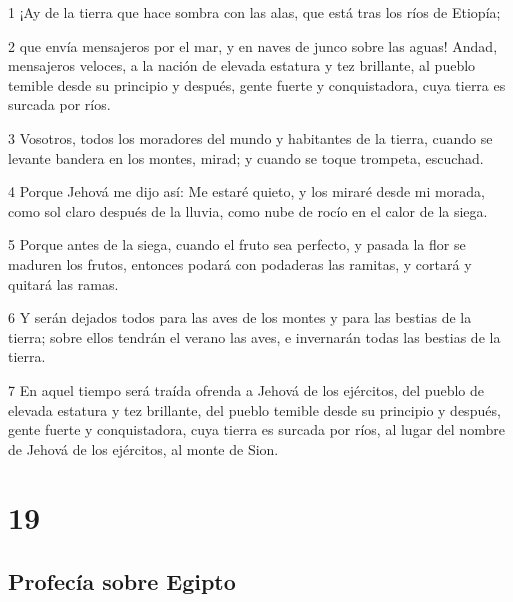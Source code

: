 \par 1 ¡Ay de la tierra que hace sombra con las alas, que está tras los ríos de Etiopía; 
\par 2 que envía mensajeros por el mar, y en naves de junco sobre las aguas! Andad, mensajeros veloces, a la nación de elevada estatura y tez brillante, al pueblo temible desde su principio y después, gente fuerte y conquistadora, cuya tierra es surcada por ríos.
\par 3 Vosotros, todos los moradores del mundo y habitantes de la tierra, cuando se levante bandera en los montes, mirad; y cuando se toque trompeta, escuchad.
\par 4 Porque Jehová me dijo así: Me estaré quieto, y los miraré desde mi morada, como sol claro después de la lluvia, como nube de rocío en el calor de la siega.
\par 5 Porque antes de la siega, cuando el fruto sea perfecto, y pasada la flor se maduren los frutos, entonces podará con podaderas las ramitas, y cortará y quitará las ramas.
\par 6 Y serán dejados todos para las aves de los montes y para las bestias de la tierra; sobre ellos tendrán el verano las aves, e invernarán todas las bestias de la tierra.
\par 7 En aquel tiempo será traída ofrenda a Jehová de los ejércitos, del pueblo de elevada estatura y tez brillante, del pueblo temible desde su principio y después, gente fuerte y conquistadora, cuya tierra es surcada por ríos, al lugar del nombre de Jehová de los ejércitos, al monte de Sion.

\chapter{19}

\section*{Profecía sobre Egipto}

